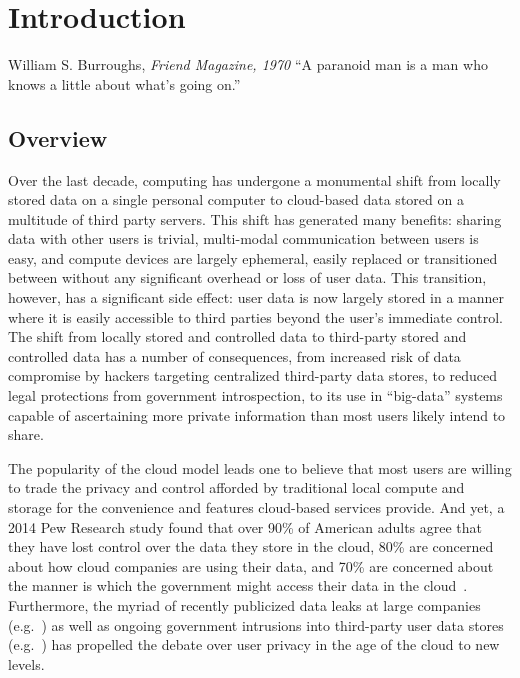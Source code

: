 \chapter{Introduction}
\label{chap:intro}

\begin{chapquote}{William S. Burroughs, \textit{Friend Magazine, 1970}}
  ``A paranoid man is a man who knows a little about what's going on.''
\end{chapquote}

\section{Overview}
\label{chap:intro:overview}

Over the last decade, computing has undergone a monumental shift from
locally stored data on a single personal computer to cloud-based data
stored on a multitude of third party servers. This shift has generated
many benefits: sharing data with other users is trivial, multi-modal
communication between users is easy, and compute devices are largely
ephemeral, easily replaced or transitioned between without any
significant overhead or loss of user data. This transition, however,
has a significant side effect: user data is now largely stored in a
manner where it is easily accessible to third parties beyond the
user's immediate control. The shift from locally stored and controlled
data to third-party stored and controlled data has a number of
consequences, from increased risk of data compromise by hackers
targeting centralized third-party data stores, to reduced legal
protections from government introspection, to its use in ``big-data''
systems capable of ascertaining more private information than most
users likely intend to share.

The popularity of the cloud model leads one to believe that most users
are willing to trade the privacy and control afforded by traditional
local compute and storage for the convenience and features cloud-based
services provide. And yet, a 2014 Pew Research study found that over
90\% of American adults agree that they have lost control over the
data they store in the cloud, 80\% are concerned about how cloud
companies are using their data, and 70\% are concerned about the
manner is which the government might access their data in the
cloud~\cite{pew-privsec14}. Furthermore, the myriad of recently
publicized data leaks at large companies
(e.g.~\cite{apple-icloudleak}) as well as ongoing government
intrusions into third-party user data stores
(e.g.~\cite{greenwald-prism}) has propelled the debate over user
privacy in the age of the cloud to new levels.

